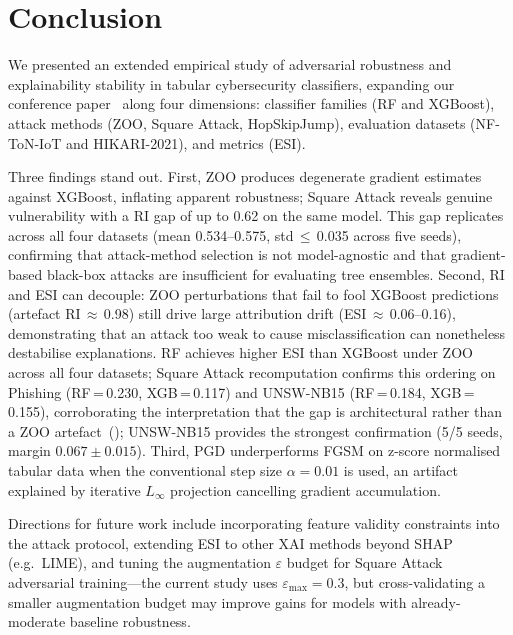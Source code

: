 \documentclass[runningheads]{llncs}
\begin{document}
\section{Conclusion}
\label{sec:conclusion}

We presented an extended empirical study of adversarial robustness and
explainability stability in tabular cybersecurity classifiers, expanding our
conference paper~\cite{khawarey2026empirical} along four dimensions: classifier
families (RF and XGBoost), attack methods (ZOO, Square Attack, HopSkipJump),
evaluation datasets (NF-ToN-IoT and HIKARI-2021), and metrics (ESI).

Three findings stand out.  First, ZOO produces degenerate gradient estimates
against XGBoost, inflating apparent robustness; Square Attack reveals genuine
vulnerability with a RI gap of up to 0.62 on the same model.  This gap
replicates across all four datasets (mean 0.534--0.575, std\,$\leq$\,0.035
across five seeds), confirming that attack-method selection is not model-agnostic
and that gradient-based black-box attacks are insufficient for evaluating tree
ensembles.  Second, RI and ESI can decouple: ZOO
perturbations that fail to fool XGBoost predictions (artefact RI\,$\approx$\,0.98)
still drive large attribution drift (ESI\,$\approx$\,0.06--0.16), demonstrating
that an attack too weak to cause misclassification can nonetheless destabilise
explanations.  RF achieves higher ESI than XGBoost under ZOO across all four datasets;
Square Attack recomputation confirms this ordering on Phishing
(RF\,=\,0.230, XGB\,=\,0.117) and UNSW-NB15 (RF\,=\,0.184, XGB\,=\,0.155),
corroborating the interpretation that the gap is architectural rather than a
ZOO artefact~(); UNSW-NB15 provides
the strongest confirmation (5/5 seeds, margin $0.067 \pm 0.015$).
Third, PGD underperforms FGSM on z-score normalised tabular data when the
conventional step size $\alpha=0.01$ is used, an artifact explained by iterative
$L_\infty$ projection cancelling gradient accumulation.

Directions for future work include incorporating feature validity constraints into
the attack protocol, extending ESI to other XAI methods beyond SHAP (e.g.\ LIME),
and tuning the augmentation $\varepsilon$ budget for Square Attack adversarial
training---the current study uses $\varepsilon_{\max}=0.3$, but cross-validating
a smaller augmentation budget may improve gains for models with already-moderate
baseline robustness.
\end{document}
